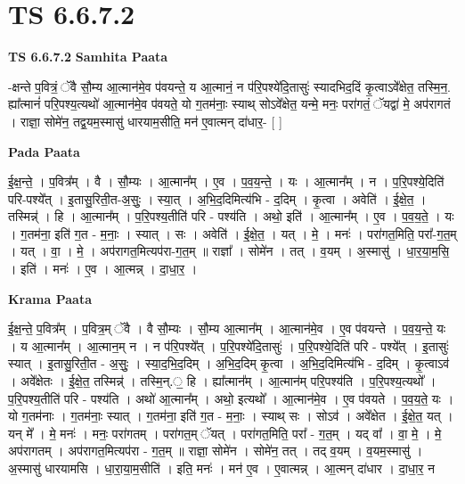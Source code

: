 \documentclass[17pt]{extarticle}
\begin{document}
\section{ TS 6.6.7.2 }

\textbf{TS 6.6.7.2 } \newline
\textbf{Samhita Paata} \newline

-क्षन्ते प॒वित्रं॒ ॅवै सौ॒म्य आ॒त्मान॑मे॒व प॑वयन्ते॒ य आ॒त्मानं॒ न प॑रि॒पश्ये॑दि॒तासुः॑ स्यादभिद॒दिं कृ॒त्वाऽवे᳚क्षेत॒ तस्मि॒न॒. ह्या᳚त्मानं॑ परि॒पश्य॒त्यथो॑ आ॒त्मान॑मे॒व प॑वयते॒ यो ग॒तम॑नाः॒ स्याथ् सोऽवे᳚क्षेत॒ यन्मे॒ मनः॒ परा॑गतं॒ ॅयद्वा॑ मे॒ अप॑रागतं । राज्ञा॒ सोमे॑न॒ तद्व॒यम॒स्मासु॑ धारयाम॒सीति॒ मन॑ ए॒वात्मन् दा॑धार॒- [  ] \newline

\textbf{Pada Paata} \newline

ई॒क्ष॒न्ते॒ । प॒वित्र᳚म् । वै । सौ॒म्यः । आ॒त्मान᳚म् । ए॒व । प॒व॒य॒न्ते॒ । यः । आ॒त्मान᳚म् । न । प॒रि॒पश्ये॒दिति॑ परि-पश्ये᳚त् । इ॒तासु॒रिती॒त-अ॒सुः॒ । स्या॒त् । अ॒भि॒द॒दिमित्य॑भि - द॒दिम् । कृ॒त्वा । अवेति॑ । ई॒क्षे॒त॒ । तस्मिन्न्॑ । हि । आ॒त्मान᳚म् । प॒रि॒पश्य॒तीति॑ परि - पश्य॑ति । अथो॒ इति॑ । आ॒त्मान᳚म् । ए॒व । प॒व॒य॒ते॒ । यः । ग॒तम॑ना॒ इति॑ ग॒त - म॒नाः॒ । स्यात् । सः । अवेति॑ । ई॒क्षे॒त॒ । यत् । मे॒ । मनः॑ । परा॑गत॒मिति॒ परा᳚-ग॒त॒म् । यत् । वा॒ । मे॒ । अप॑रागत॒मित्यप॑रा-ग॒त॒म् ॥ राज्ञा᳚ । सोमे॑न । तत् । व॒यम् । अ॒स्मासु॑ । धा॒र॒या॒म॒सि॒ । इति॑ । मनः॑ । ए॒व । आ॒त्मन्न् । दा॒धा॒र॒ ।  \newline


\textbf{Krama Paata} \newline

ई॒क्ष॒न्ते॒ प॒वित्र᳚म् । प॒वित्र॒म् ॅवै । वै सौ॒म्यः । सौ॒म्य आ॒त्मान᳚म् । आ॒त्मान॑मे॒व । ए॒व प॑वयन्ते । प॒व॒य॒न्ते॒ यः । य आ॒त्मान᳚म् । आ॒त्मान॒म् न । न प॑रि॒पश्ये᳚त् । प॒रि॒पश्ये॑दि॒तासुः॑ । प॒रि॒पश्ये॒दिति॑ परि - पश्ये᳚त् । इ॒तासुः॑ स्यात् । इ॒तासु॒रिती॒त - अ॒सुः॒ । स्या॒द॒भि॒द॒दिम् । अ॒भि॒द॒दिम् कृ॒त्वा । अ॒भि॒द॒दिमित्य॑भि - द॒दिम् । कृ॒त्वाऽव॑ । अवे᳚क्षेतः । ई॒क्षे॒त॒ तस्मिन्न्॑ । तस्मि॒न्.॒ हि । ह्या᳚त्मान᳚म् । आ॒त्मान॑म् परि॒पश्य॑ति । प॒रि॒पश्य॒त्यथो᳚ । प॒रि॒पश्य॒तीति॑ परि - पश्य॑ति । अथो॑ आ॒त्मान᳚म् । अथो॒ इत्यथो᳚ । आ॒त्मान॑मे॒व । ए॒व प॑वयते । प॒व॒य॒ते॒ यः । यो ग॒तम॑नाः । ग॒तम॑नाः॒ स्यात् । ग॒तम॑ना॒ इति॑ ग॒त - म॒नाः॒ । स्याथ् सः । सोऽव॑ । अवे᳚क्षेत । ई॒क्षे॒त॒ यत् । यन् मे᳚ । मे॒ मनः॑ । मनः॒ परा॑गतम् । परा॑गत॒म् ॅयत् । परा॑गत॒मिति॒ परा᳚ - ग॒त॒म् । यद् वा᳚ । वा॒ मे॒ । मे॒ अप॑रागतम् । अप॑रागत॒मित्यप॑रा - ग॒त॒म् ॥ राज्ञा॒ सोमे॑न । सोमे॑न॒ तत् । तद् व॒यम् । व॒यम॒स्मासु॑ । अ॒स्मासु॑ धारयामसि । धा॒रा॒या॒म॒सीति॑ । इति॒ मनः॑ । मन॑ ए॒व । ए॒वात्मन्न् । आ॒त्मन् दा॑धार । दा॒धा॒र॒ न \newline
\end{document}
